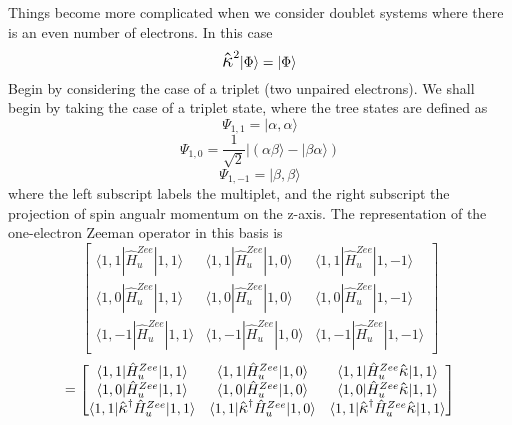 \documentclass[12pt]{article}
\newcommand{\K}{\mathlarger{\mathlarger{\hat{\kappa}}}}
\begin{document}
\noindent Things become more complicated when we consider 
doublet systems where there is an even number of electrons. In this case
\begin{equation}
\K^{2}|\Phi\rangle = |\Phi\rangle
\end{equation}
\noindent Begin by considering the case of a triplet (two unpaired electrons).
We shall begin by taking the case of a triplet state, where the tree states
are defined as
\begin{equation}
\Psi_{1,1} = | \alpha, \alpha\rangle
\end{equation}
\begin{equation}
\Psi_{1,0} = \frac{1}{\sqrt{2}}|( \alpha\beta\rangle -| \beta\alpha\rangle)
\end{equation}
\begin{equation}
\Psi_{1,-1} = | \beta, \beta\rangle
\end{equation}
\noindent where the left subscript labels the multiplet, and the
right subscript the projection of spin angualr momentum on the z-axis.
The representation of the one-electron Zeeman operator in this basis is
\begin{equation}
\begin{bmatrix}
\langle 1,1 | \hat{H}^{Zee}_{u} | 1,1  \rangle&
\langle 1,1 | \hat{H}^{Zee}_{u} | 1,0  \rangle&
\langle 1,1 | \hat{H}^{Zee}_{u} | 1,-1  \rangle
\\ 
\langle 1,0 | \hat{H}^{Zee}_{u} | 1,1    \rangle&
\langle 1,0 | \hat{H}^{Zee}_{u} | 1,0    \rangle&
\langle 1,0 | \hat{H}^{Zee}_{u} | 1,-1   \rangle
\\ 
\langle 1,-1 | \hat{H}^{Zee}_{u} | 1,1    \rangle& 
\langle 1,-1 | \hat{H}^{Zee}_{u} | 1,0    \rangle&
\langle 1,-1 | \hat{H}^{Zee}_{u} | 1,-1   \rangle
\end{bmatrix}
\end{equation}
\begin{equation}
=
\begin{bmatrix}
\langle 1,1 |            \hat{H}^{Zee}_{u}   | 1,1  \rangle&
\langle 1,1 |            \hat{H}^{Zee}_{u}   | 1,0  \rangle&
\langle 1,1 |            \hat{H}^{Zee}_{u}\K | 1,1  \rangle
\\                       
\langle 1,0 |            \hat{H}^{Zee}_{u}   | 1,1   \rangle&
\langle 1,0 |            \hat{H}^{Zee}_{u}   | 1,0   \rangle&
\langle 1,0 |            \hat{H}^{Zee}_{u}\K | 1,1   \rangle
\\ 
\langle 1,1 |\K^{\dagger} \hat{H}^{Zee}_{u}   | 1,1   \rangle& 
\langle 1,1 |\K^{\dagger} \hat{H}^{Zee}_{u}   | 1,0   \rangle&
\langle 1,1 |\K^{\dagger} \hat{H}^{Zee}_{u}\K | 1,1   \rangle
\end{bmatrix}
\end{equation}
\end{document}
